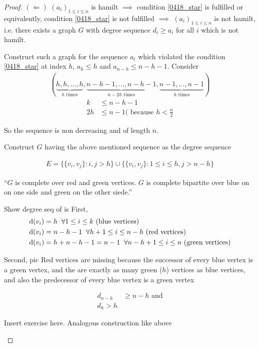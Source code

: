 \documentclass[aagt.tex]{subfiles}
\begin{document}
\begin{proof}
$(\Leftarrow)$ $(a_i)_{1 \leq i \leq n}$ is hamilt $\implies$ condition \ref{0418_star} is fulfilled
or equivalently, condition \ref{0418_star} is not fulfilled $\implies$ $(a_i)_{1 \leq i \leq n}$ is not hamilt, i.e. there exists a graph $G$ with degree sequence $d_i \geq a_i$ for all $i$ which is not hamilt.

Construct such a graph for the sequence $a_i$ which violated the condition \ref{0418_star} at index $h$, $a_h \leq h$ and $a_{n-h} \leq n-h-1$.
Consider 
\begin{align}\label{0421_5}
  (\underbrace{h,h,\dots,h}_{h \text{ times}},\underbrace{n-h-1,\dots,n-h-1}_{n-2h \text{ times}},\underbrace{n-1,\dots,n-1}_{h \text{ times}})
\end{align}
\begin{align*}
  k &\leq n-h-1 \\
  2h &\leq n-1 (\text{ because } h < \frac{n}{2}
\end{align*}

So the sequence is non decreasing and of length $n$.

Construct $G$ having the above mentioned sequence as the degree sequence

\begin{align*}
  E = \{\{v_i,v_j\}: i,j > h\} \cup \{\{v_i,v_j\}: 1 \leq i \leq h, j > n-h \}
\end{align*}

\enquote{$G$ is complete over red and green vertices. $G$ is complete bipartite over blue on on one side and green on the other siede.}

Show degree seq of is
First,
\begin{align*}
  \operatorname{d}(v_i) &= h \;\; \forall 1 \leq i \leq k \text{ (blue vertices)} \\
  \operatorname{d}(v_i) &= n-h-1 \;\; \forall h+1 \leq i \leq n-h \text{ (red vertices)} \\
  \operatorname{d}(v_i) &= h+n-h-1 = n-1 \;\; \forall n-h+1 \leq i \leq n \text{ (green vertices)}
\end{align*}

Second, pic
Red vertices are missing because the successor of every blue vertex is a green vertex, and the are exactly as many green ($h$) vertices as blue vertices, and also the predecessor of every blue vertex is a green vertex

\begin{align*}
  d_{n-h} &\geq n-h \text{ and} \\
  d_h > h
\end{align*}

\begin{rem}[Exercise]
  Insert exercise here. Analogous construction like above
\end{rem}
\end{proof}
\end{document}
